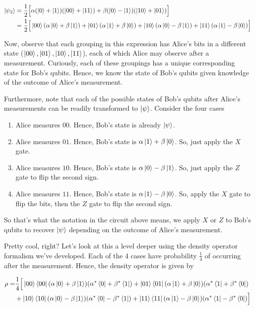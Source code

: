 \documentclass[11pt]{article}
\newcommand\0{\mathbf{0}}
\newcommand\<{\langle}
\renewcommand\>{\rangle}
\begin{document}
\begin{align*}
\ket{\psi_2} &= \frac{1}{2}\Big[\alpha(\ket{0}+\ket{1})(\ket{00} + \ket{11}) + \beta(\ket{0}-\ket{1})(\ket{10} + \ket{01})\Big] \\
&= \frac{1}{2}\Big[ \ket{00} (\alpha\ket{0} + \beta\ket{1}) + \ket{01}(\alpha\ket{1} + \beta \ket{0}) + \ket{10}(\alpha\ket{0} - \beta\ket{1}) + \ket{11}(\alpha\ket{1} - \beta\ket{0}) \Big]
\end{align*}

Now, observe that each grouping in this expression has Alice's bits in a different state ($\ket{00},\ket{01},\ket{10},\ket{11}$), each of which Alice may observe after a measurement. Curiously, each of these groupings has a unique corresponding state for Bob's qubits. Hence, we know the state of Bob's qubits given knowledge of the outcome of Alice's measurement.

Furthermore, note that each of the possible states of Bob's qubits after Alice's measurements can be readily transformed to $\ket{\psi}$. Consider the four cases

\begin{enumerate}
\item Alice measures $00$. Hence, Bob's state is already $\ket{\psi}$. 
\item Alice measures $01$. Hence, Bob's state is $\alpha\ket{1} + \beta \ket{0}$. So, just apply the $X$ gate. 
\item Alice measures $10$. Hence, Bob's state is $\alpha\ket{0} - \beta\ket{1}$. So, just apply the $Z$ gate to flip the second sign. 
\item Alice measures $11$. Hence, Bob's state is $\alpha\ket{1} - \beta\ket{0}$. So, apply the $X$ gate to flip the bits, then the $Z$ gate to flip the second sign. 
\end{enumerate}

So that's what the notation in the circuit above means, we apply $X$ or $Z$ to Bob's qubits to recover $\ket{\psi}$ depending on the outcome of Alice's measurement.

Pretty cool, right? Let's look at this a level deeper using the density operator formalism we've developed. Each of the 4 cases have probability $\frac{1}{4}$ of occurring after the measurement. Hence, the density operator is given by

\begin{align*}
	\rho =& \frac{1}{4}\Big[ \ket{00}\bra{00} (\alpha\ket{0} + \beta\ket{1})(\alpha^*\bra{0} + \beta^*\bra{1}) + \ket{01}\bra{01}(\alpha\ket{1} + \beta \ket{0})(\alpha^*\bra{1} + \beta^* \bra{0}) \\
	&+ \ket{10}\bra{10}(\alpha\ket{0} - \beta\ket{1})(\alpha^*\bra{0} - \beta^*\bra{1}) + \ket{11}\bra{11}(\alpha\ket{1} - \beta\ket{0})(\alpha^*\bra{1} - \beta^*\bra{0}) \Big]
\end{align*}
\end{document}
